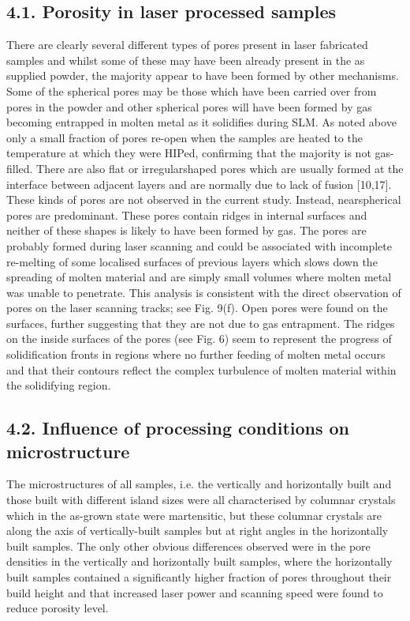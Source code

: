 \documentclass[10pt]{article}
\begin{document}
\subsection*{4.1. Porosity in laser processed samples}
There are clearly several different types of pores present in laser fabricated samples and whilst some of these may have been already present in the as supplied powder, the majority appear to have been formed by other mechanisms. Some of the spherical pores may be those which have been carried over from pores in the powder and other spherical pores will have been formed by gas becoming entrapped in molten metal as it solidifies during SLM. As noted above only a small fraction of pores re-open when the samples are heated to the temperature at which they were HIPed, confirming that the majority is not gas-filled. There are also flat or irregularshaped pores which are usually formed at the interface between adjacent layers and are normally due to lack of fusion [10,17]. These kinds of pores are not observed in the current study. Instead, nearspherical pores are predominant. These pores contain ridges in internal surfaces and neither of these shapes is likely to have been formed by gas. The pores are probably formed during laser scanning and could be associated with incomplete re-melting of some localised surfaces of previous layers which slows down the spreading of molten material and are simply small volumes where molten metal was unable to penetrate. This analysis is consistent with the direct observation of pores on the laser scanning tracks; see Fig. 9(f). Open pores were found on the surfaces, further suggesting that they are not due to gas entrapment. The ridges on the inside surfaces of the pores (see Fig. 6) seem to represent the progress of solidification fronts in regions where no further feeding of molten metal occurs and that their contours reflect the complex turbulence of molten material within the solidifying region.

\subsection*{4.2. Influence of processing conditions on microstructure}
The microstructures of all samples, i.e. the vertically and horizontally built and those built with different island sizes were all characterised by columnar crystals which in the as-grown state were martensitic, but these columnar crystals are along the axis of vertically-built samples but at right angles in the horizontally built samples. The only other obvious differences observed were in the pore densities in the vertically and horizontally built samples, where the horizontally built samples contained a significantly higher fraction of pores throughout their build height and that increased laser power and scanning speed were found to reduce porosity level.
\end{document}
